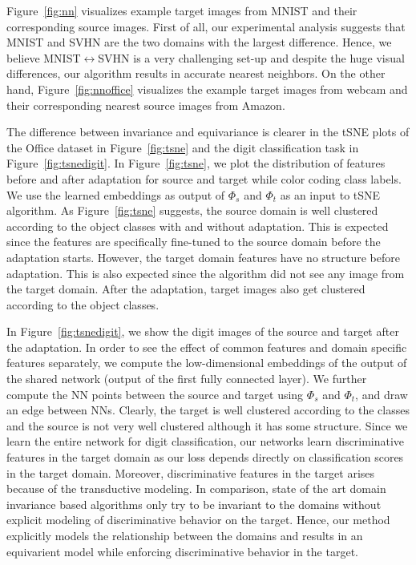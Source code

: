 Figure~\ref{fig:nn} visualizes example target images from MNIST and their corresponding source images. First of all, our experimental analysis suggests that MNIST and SVHN are the two domains with the largest difference. Hence, we believe MNIST$\leftrightarrow$SVHN is a very challenging set-up and despite the huge visual differences, our algorithm results in accurate nearest neighbors. On the other hand, Figure~\ref{fig:nnoffice} visualizes the example target images from webcam and their corresponding nearest source images from Amazon. 


The difference between invariance and equivariance is clearer in the tSNE plots of the Office dataset in Figure~\ref{fig:tsne} and the digit classification task in Figure~\ref{fig:tsnedigit}. In Figure~\ref{fig:tsne}, we plot the distribution of features before and after adaptation for source and target while color coding class labels. We use the learned embeddings as output of $\Phi_s$ and $\Phi_t$ as an input to tSNE algorithm\cite{tsne}. As Figure~\ref{fig:tsne} suggests, the source domain is well clustered according to the object classes with and without adaptation. This is expected since the features are specifically fine-tuned to the source domain before the adaptation starts. However, the target domain features have no structure before adaptation. This is also expected since the algorithm did not see any image from the target domain. After the adaptation, target images also get clustered according to the object classes. 




In Figure~\ref{fig:tsnedigit}, we show the digit images of the source and target after the adaptation. In order to see the effect of common features and domain specific features separately, we compute the low-dimensional embeddings of the output of the shared network (output of the first fully connected layer). We further compute the NN points between the source and target using $\Phi_s$ and $\Phi_t$, and draw an edge between NNs. Clearly, the target is well clustered according to the classes and the source is not very well clustered although it has some structure. Since we learn the entire network for digit classification, our networks learn discriminative features in the target domain as our loss depends directly on classification scores in the target domain. Moreover, discriminative features in the target arises because of the transductive modeling. In comparison, state of the art domain invariance based algorithms only try to be invariant to the domains without explicit modeling of discriminative behavior on the target. Hence, our method explicitly models the relationship between the domains and results in an equivarient model while enforcing discriminative behavior in the target. 


